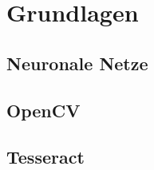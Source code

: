 \section{Grundlagen}
\label{sec:grundlagen}

\subsection{Neuronale Netze}

\subsection{OpenCV}

\subsection{Tesseract}